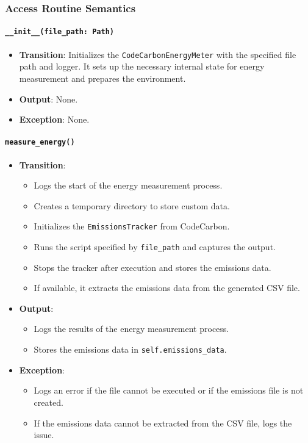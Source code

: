 \documentclass[12pt, titlepage]{article}
\begin{document}
\subsubsection{Access Routine Semantics}
\paragraph{\texttt{\_\_init\_\_(file\_path: Path)}}
\begin{itemize}
  \item \textbf{Transition}: Initializes the \texttt{CodeCarbonEnergyMeter} with the specified file path and logger. It sets up the necessary internal state for energy measurement and prepares the environment.
  \item \textbf{Output}: None.
  \item \textbf{Exception}: None.
\end{itemize}

\paragraph{\texttt{measure\_energy()}}
\begin{itemize}
  \item \textbf{Transition}:
    \begin{itemize}
      \item Logs the start of the energy measurement process.
      \item Creates a temporary directory to store custom data.
      \item Initializes the \texttt{EmissionsTracker} from CodeCarbon.
      \item Runs the script specified by \texttt{file\_path} and captures the output.
      \item Stops the tracker after execution and stores the emissions data.
      \item If available, it extracts the emissions data from the generated CSV file.
    \end{itemize}
  \item \textbf{Output}: 
    \begin{itemize}
        \item Logs the results of the energy measurement process.
        \item Stores the emissions data in \texttt{self.emissions\_data}.
    \end{itemize}
   \item \textbf{Exception}: 
      \begin{itemize}
        \item Logs an error if the file cannot be executed or if the emissions file is not created.
        \item If the emissions data cannot be extracted from the CSV file, logs the issue.
      \end{itemize}
 \end{itemize}
\end{document}
